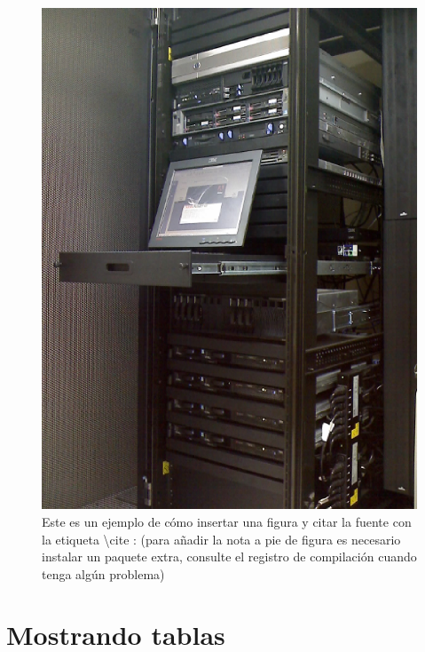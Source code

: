 \begin{figure}[H] %
\centering
\includegraphics[scale=0.5]{Figura1.eps}  %
\caption{Este es un ejemplo de cómo insertar una figura y citar la fuente con la etiqueta \textbackslash cite :  \cite{figura1} (para añadir la nota a pie de figura es necesario instalar un paquete extra, consulte el registro de compilación cuando tenga algún problema)} \label{fig:figura1}
\end{figure}



\section{Mostrando tablas}

